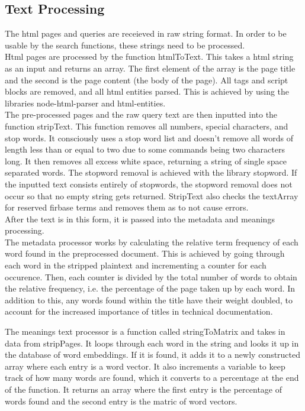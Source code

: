 \subsection{Text Processing}
The html pages and queries are receieved in raw string format. In order to be usable by the search functions, these strings need to be processed. \\
Html pages are processed by the function htmlToText. This takes a html string as an input and returns an array. The first element of the array is the page title and the second is the page content (the body of the page). All tags and script blocks are removed, and all html entities parsed. This is achieved by using the libraries node-html-parser and html-entities. \\ 
The pre-processed pages and the raw query text are then inputted into the function stripText. This function removes all numbers, special characters, and stop words. It consciously uses a stop word list and doesn't remove all words of length less than or equal to two due to some commands being two characters long. It then removes all excess white space, returning a string of single space separated words. The stopword removal is achieved with the library stopword. If the inputted text consists entirely of stopwords, the stopword removal does not occur so that no empty string gets returned. StripText also checks the textArray for reserved firbase terms and removes them as to not cause errors.\\
After the text is in this form, it is passed into the metadata and meanings processing. \\
The metadata processor works by calculating the relative term frequency of each word found in the preprocessed document. This is achieved by going through each word in the stripped plaintext and incrementing a counter for each occurence. Then, each counter is divided by the total number of words to obtain the relative frequency, i.e. the percentage of the page taken up by each word. In addition to this, any words found within the title have their weight doubled, to account for the increased importance of titles in technical documentation.

The meanings text processor is a function called stringToMatrix and takes in data from stripPages. It loops through each word in the string and looks it up in the database of word embeddings. If it is found, it adds it to a newly constructed array where each entry is a word vector. It also increments a variable to keep track of how many words are found, which it converts to a percentage at the end of the function. It returns an array where the first entry is the percentage of words found and the second entry is the matric of word vectors.
